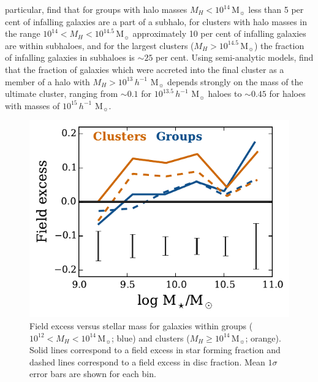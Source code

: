 \documentclass[a4paper,fleqn,usenatbib]{mnras}
\newcommand{\Msun}{\,\mathrm{M_{\sun}}}
\begin{document}
particular, \citet{hou2014} find that for groups with halo masses $M_H
< 10^{14}\Msun$ less than 5 per cent of infalling galaxies are a
part of a subhalo, for clusters with halo masses in the range $10^{14}
< M_H < 10^{14.5}\Msun$ approximately 10 per cent of infalling galaxies are
within subhaloes, and for the largest clusters ($M_H >
10^{14.5}\Msun$) the fraction of infalling galaxies in subhaloes is
$\sim 25$ per cent.  Using semi-analytic models, \citet{mcgee2009}
find that the fraction of galaxies which were accreted into the final
cluster as a member of a halo with $M_H > 10^{13}\,h^{-1}\,\Msun$
depends strongly on the mass of the ultimate cluster, ranging from
$\sim 0.1$ for $10^{13.5}\,h^{-1}\,\Msun$ haloes to $\sim 0.45$ for
haloes with masses of $10^{15}\,h^{-1}\,\Msun$.

\begin{figure}
  \centering
  \includegraphics[width=\columnwidth]{mh_excess.pdf}
  \caption{Field excess versus stellar mass for galaxies within groups
  ($10^{12} < M_H < 10^{14} \Msun$; blue) and clusters ($M_H \ge 10^{14}
    \Msun$; orange).  Solid lines correspond to a field excess in star forming
    fraction and dashed lines correspond to a field excess in disc
    fraction.  Mean $1 \sigma$ error bars are shown for each bin.}
  \label{fig:mh_excess}
\end{figure}
\end{document}
